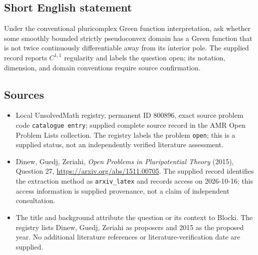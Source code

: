 \documentclass[11pt]{article}
\begin{document}
\subsection{Short English statement}
Under the conventional pluricomplex Green function interpretation, ask whether some smoothly bounded strictly pseudoconvex domain has a Green function that is not twice continuously differentiable away from its interior pole. The supplied record reports \(C^{1,1}\) regularity and labels the question open; its notation, dimension, and domain conventions require source confirmation.
\subsection{Sources}
\begin{itemize}
\item Local UnsolvedMath registry, permanent ID \(800896\), exact source problem code \texttt{catalogue entry}; supplied complete source record in the AMR Open Problem Lists collection. The registry labels the problem \texttt{open}; this is a supplied status, not an independently verified literature assessment.
\item Dinew, Guedj, Zeriahi, \emph{Open Problems in Pluripotential Theory} (2015), Question 27, \url{https://arxiv.org/abs/1511.00705}. The supplied record identifies the extraction method as \texttt{arxiv\_latex} and records access on 2026-10-16; this access information is supplied provenance, not a claim of independent consultation.
\item The title and background attribute the question or its context to Blocki. The registry lists Dinew, Guedj, Zeriahi as proposers and 2015 as the proposed year. No additional literature references or literature-verification date are supplied.
\end{itemize}
\end{document}
